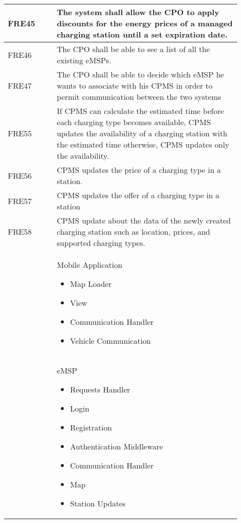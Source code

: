 {\begin{longtable}{|p{0.20\linewidth}p{0.75\linewidth}|}
    \hline  
    \rowcolor{bluepoli!15}
    FRE45 &The system shall allow the CPO to apply discounts for the energy prices of a managed charging station until a set expiration date. \\
    \hline
    \rowcolor{bluepoli!15}
    FRE46 & The CPO shall be able to see a list of all the existing eMSPs. \\
    \hline
    \rowcolor{bluepoli!15} FRE47 & The CPO shall be able to decide which eMSP he wants to associate with his CPMS in order to permit communication between the two systems \\
    \hline
    \rowcolor{bluepoli!15} FRE55 & If CPMS can calculate the estimated time before each charging type becomes available, CPMS updates the availability of a charging station with the estimated time otherwise, CPMS updates only the availability. \\
    \hline
    \rowcolor{bluepoli!15} FRE56 & CPMS updates the price of a charging type in a station. \\
    \hline  
    \rowcolor{bluepoli!15} FRE57 & CPMS updates the offer of a charging type in a station \\
    \hline  
     \rowcolor{bluepoli!15}
     FRE58 & CPMS update about the data of the newly created charging station such as location, prices, and supported charging types. \\
     \hline
    \rowcolor{bluepoli!5}  & Mobile Application  \newline
    \begin{itemize}
        \item Map Loader
        \item View
        \item Communication Handler
        \item Vehicle Communication
    \end{itemize} \\
    \hline
    \rowcolor{bluepoli!5}  & eMSP  \newline
    \begin{itemize}
        \item Requests Handler
        \item Login
        \item Registration
        \item Authentication Middleware
        \item Communication
        Handler
        \item Map
        \item Station Updates

\end{itemize}
\end{longtable}}
